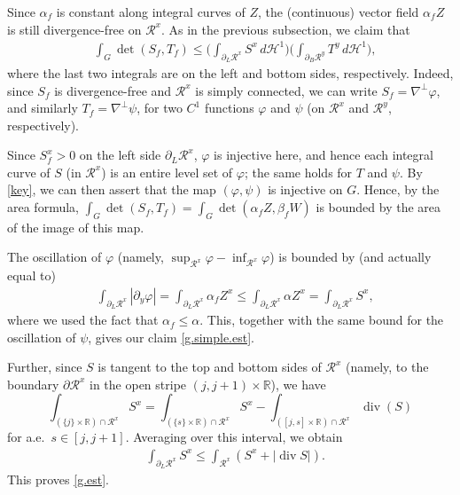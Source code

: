 \documentclass[11pt,a4paper]{amsart}
\newcommand{\R}{\mathbb{R}}
\newcommand{\de}{\partial}
\renewcommand{\phi}{\varphi}
\theoremstyle{definition}
\DeclareMathOperator{\dive}{div}
\newcommand{\hau}{\mathcal{H}}
\begin{document}
Since $\alpha_f$ is constant along integral curves of $Z$, the (continuous) vector field $\alpha_f Z$ is still divergence-free on $\mathcal{R}^x$.
As in the previous subsection, we claim that
\begin{align}\label{g.simple.est}
	&\int_{G}\det(S_f,T_f)\le\Big(\int_{\de_L\mathcal{R}^x}S^x\,d\hau^1\Big)\Big(\int_{\de_B\mathcal{R}^y}T^y\,d\hau^1\Big),
\end{align}
where the last two integrals are on the left and bottom sides, respectively.
Indeed, since $S_f$ is divergence-free and $\mathcal{R}^x$ is simply connected, we can write $S_f=\nabla^\perp\phi$, and similarly $T_f=\nabla^\perp\psi$, for two $C^1$ functions $\phi$ and $\psi$ (on $\mathcal{R}^x$ and $\mathcal{R}^y$, respectively). %

Since $S_f^x>0$ on the left side $\de_L\mathcal{R}^x$,
$\phi$ is injective here, and hence
each integral curve of $S$ (in $\mathcal{R}^x$) is an entire level set of $\phi$;
the same holds for $T$ and $\psi$.
By \cref{key}, we can then assert that the map $(\phi,\psi)$ is injective on $G$. Hence, by the area formula, $\int_{G}\det(S_f,T_f)=\int_{G}\det(\alpha_f Z,\beta_f W)$ is bounded by the area of the image of this map.

The oscillation of $\phi$ (namely, $\sup_{\mathcal{R}^x}\phi-\inf_{\mathcal{R}^x}\phi$) is bounded by (and actually equal to)
\begin{align*}
	&\int_{\de_L\mathcal{R}^x}|\de_y\phi|
	=\int_{\de_L\mathcal{R}^x}\alpha_f Z^x
	\le\int_{\de_L\mathcal{R}^x}\alpha Z^x
	=\int_{\de_L\mathcal{R}^x}S^x,
\end{align*}
where we used the fact that $\alpha_f\le\alpha$. This, together with the same bound for the oscillation of $\psi$, gives our claim \cref{g.simple.est}.

Further, since $S$ is tangent to the top and bottom sides of $\mathcal{R}^x$
(namely, to the boundary $\de\mathcal{R}^x$ in the open stripe $(j,j+1)\times\R$), we have
$$\int_{(\{j\}\times\R)\cap\mathcal{R}^x}S^x
=\int_{(\{s\}\times\R)\cap\mathcal{R}^x}S^x
-\int_{([j,s]\times\R)\cap\mathcal{R}^x}\operatorname{div}(S)$$
for a.e.\ $s\in[j,j+1]$.
Averaging over this interval, we obtain
\begin{align*}
	&\int_{\de_L\mathcal{R}^x}S^x\le\int_{\mathcal{R}^x}(S^x+\lvert \dive S\rvert).
\end{align*}
This proves \cref{g.est}.
\end{document}
